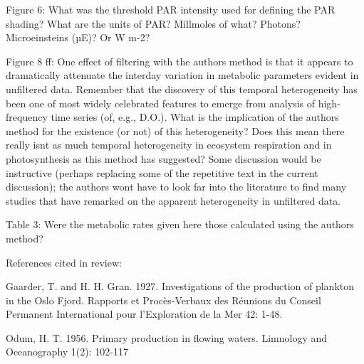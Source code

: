\documentclass[letterpaper,12pt]{article}\usepackage[]{graphicx}\usepackage[]{color}
\begin{document}
Figure 6: What was the threshold PAR intensity used for defining the PAR shading? What are the units of PAR? Millmoles of what? Photons? Microeinsteins (µE)? Or W m-2?
 
Figure 8 ff: One effect of filtering with the authors method is that it appears to dramatically attenuate the interday variation in metabolic parameters evident in unfiltered data. Remember that the discovery of this temporal heterogeneity has been one of most widely celebrated features to emerge from analysis of high-frequency time series (of, e.g., D.O.). What is the implication of the authors method for the existence (or not) of this heterogeneity? Does this mean there really isnt as much temporal heterogeneity in ecosystem respiration and in photosynthesis as this method has suggested? Some discussion would be instructive (perhaps
replacing some of the repetitive text in the current discussion); the authors wont have to look far into the literature to find many studies that have remarked on the apparent heterogeneity in unfiltered data.

Table 3: Were the metabolic rates given here those calculated using the authors method?

References cited in review:

Gaarder, T. and H. H. Gran. 1927. Investigations of the production of plankton in the Oslo Fjord. Rapports et Procès-Verbaux des Réunions du Conseil Permanent International pour l'Exploration de la Mer 42: 1-48.

Odum, H. T. 1956. Primary production in flowing waters. Limnology and Oceanography 1(2):
102-117
\end{document}
